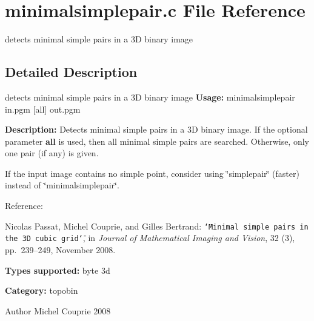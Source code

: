 \section{minimalsimplepair.c File Reference}
\label{minimalsimplepair_8c}


detects minimal simple pairs in a 3D binary image  




\subsection{Detailed Description}
detects minimal simple pairs in a 3D binary image {\bfseries Usage:} minimalsimplepair in.pgm [all] out.pgm

{\bfseries Description:} Detects minimal simple pairs in a 3D binary image. If the optional parameter {\bfseries all} is used, then all minimal simple pairs are searched. Otherwise, only one pair (if any) is given.

If the input image contains no simple point, consider using \char`\"{}simplepair\char`\"{} (faster) instead of \char`\"{}minimalsimplepair\char`\"{}.

Reference:\par
 [PCB08] Nicolas Passat, Michel Couprie, and Gilles Bertrand: {\tt \char`\"{}Minimal simple pairs in the 3D cubic grid\char`\"{}}, in {\itshape Journal of Mathematical Imaging and Vision\/}, 32 (3), pp.~239–249, November 2008.\par


{\bfseries Types supported:} byte 3d

{\bfseries Category:} topobin

\begin{DoxyAuthor}{Author}
Michel Couprie 2008 
\end{DoxyAuthor}
